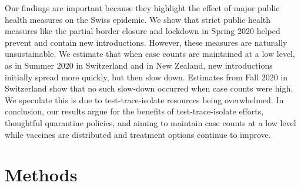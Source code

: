 \documentclass[9pt,twoside,lineno]{pnas-new} %
\begin{document}

Our findings are important because they highlight the effect of major public health measures on the Swiss epidemic. We show that strict public health measures like the partial border closure and lockdown in Spring 2020 helped prevent and contain new introductions. However, these measures are naturally unsustainable. We estimate that when case counts are maintained at a low level, as in Summer 2020 in Switzerland and in New Zealand, new introductions initially spread more quickly, but then slow down. Estimates from Fall 2020 in Switzerland show that no such slow-down occurred when case counts were high. We speculate this is due to test-trace-isolate resources being overwhelmed. In conclusion, our results argue for the benefits of test-trace-isolate efforts, thoughtful quarantine policies, and aiming to maintain case counts at a low level while vaccines are distributed and treatment options continue to improve.

\section{Methods}
\end{document}
